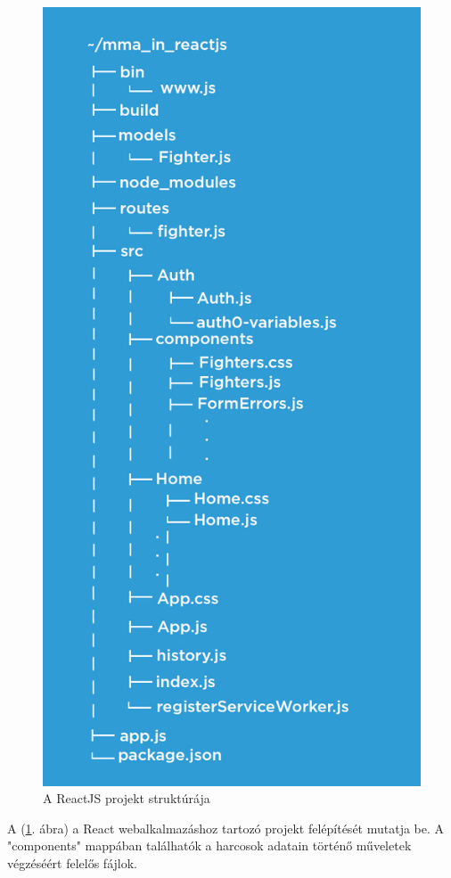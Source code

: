 \begin{figure}[htb]
\centering
\includegraphics[scale=0.7]{kepek/mma_in_reactjs.jpeg}
\caption{A ReactJS projekt struktúrája}
\label{fig:reactjs_structure}
\end{figure}


A (\ref{fig:reactjs_structure}. ábra) a React webalkalmazáshoz tartozó projekt felépítését mutatja be. A "components" mappában találhatók a harcosok adatain történő műveletek végzéséért felelős fájlok. \cite{React könyv} \cite{React oldal} 